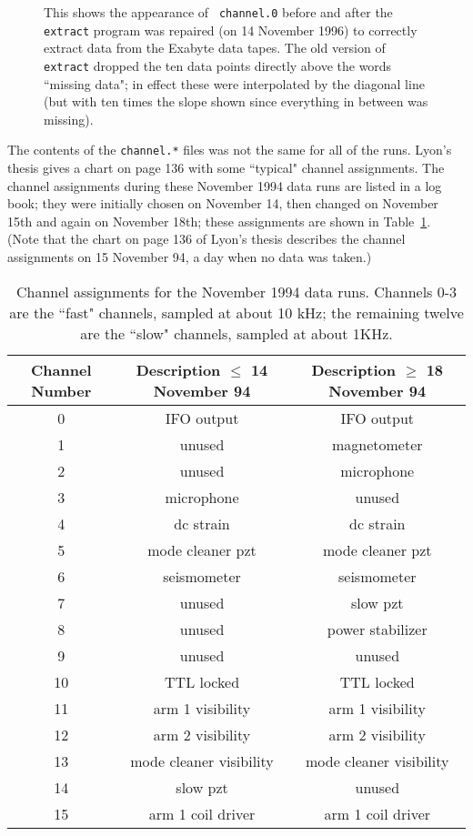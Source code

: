\begin{figure}[hb]
\begin{center}
\caption{ \label{f:dropout} This shows the appearance of {\tt
channel.0} before and after the {\tt extract} program was repaired (on
14 November 1996) to correctly extract data from the Exabyte data
tapes. The old version of {\tt extract} dropped the ten data points
directly above the words ``missing data"; in effect these were
interpolated by the diagonal line (but with ten times the slope shown
since everything in between was missing).}
\end{center}
\end{figure}

The contents of the {\tt channel.*} files was not the same for all of
the runs.  Lyon's thesis \cite{Lyons} gives a chart on page 136 with
some ``typical" channel assignments.  The channel assignments during
these November 1994 data runs are listed in a log book; they were
initially chosen on November 14, then changed on November 15th and
again on November 18th; these assignments are shown in
Table~\ref{t:chassign}.   (Note that the chart on page 136 of Lyon's
thesis describes the channel assignments on 15 November 94, a day when
no data was taken.)

\begin{table}[h]
\begin{tabular}[]{c|c|c}
\hline
Channel Number &  Description $\le$ 14 November 94 & Description $\ge$ 18 November 94 \\
\hline
0 & IFO output & IFO output \\
1 & unused & magnetometer \\
2 & unused & microphone \\
3 & microphone & unused \\
\hline
4 & dc strain & dc strain \\
5 & mode cleaner pzt & mode cleaner pzt \\
6 & seismometer & seismometer \\
7 & unused & slow pzt\\
8 & unused&  power stabilizer \\
9 & unused  & unused  \\
10 & TTL locked &  TTL locked \\
11 & arm 1 visibility& arm 1 visibility \\
12 & arm 2 visibility &  arm 2 visibility\\
13 & mode cleaner visibility & mode cleaner visibility \\
14 & slow pzt &  unused \\
15 & arm 1 coil driver & arm 1 coil driver \\
\hline
\end{tabular}
\caption{Channel assignments for the November 1994 data runs.  Channels
0-3 are the ``fast" channels, sampled at about 10 kHz; the remaining
twelve are the ``slow" channels, sampled at about 1KHz.}
\label{t:chassign}
\end{table}
\clearpage
